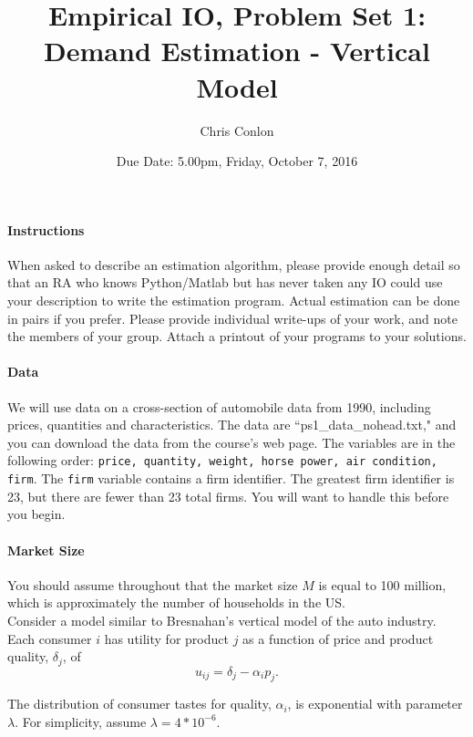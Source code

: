 \documentclass[12pt]{article}
\begin{document}
\title{Empirical IO, Problem Set 1: \\
Demand Estimation - Vertical Model}
\author{Chris Conlon}
\date{Due Date: 5.00pm, Friday, October 7, 2016}
\maketitle

\paragraph{Instructions} When asked to describe an estimation algorithm, please provide enough detail so
that an RA who knows Python/Matlab but has never taken any IO could use your description
to write the estimation program. Actual estimation can be done
in pairs if you prefer.  
Please provide individual write-ups of your work, and
note the members of your group. Attach a printout of your programs to your solutions.

\paragraph{Data} We will use data on a cross-section of automobile data from 1990, including prices, quantities and characteristics. The data are ``ps1\_data\_nohead.txt," and you can download the data from the course's web page. The variables are in the following order: \texttt{price, quantity, weight, horse power, air condition, firm}.
The \texttt{firm} variable contains a firm identifier. The greatest firm identifier is 23, but there are fewer than 23 total firms. You will want to handle this before you begin.

\paragraph{Market Size} You should assume throughout that the
market size $M$ is equal to 100 million, which is approximately the number
of households in the US. \\

\noindent
Consider a model similar to Bresnahan's vertical model of the auto industry.
Each consumer $i$ has utility for product $j$ as a function of price and
product quality, $\delta _{j}$, of
\[
u_{ij}=\delta _{j}-\alpha _{i}p_{j}.
\]

\noindent
The distribution of consumer tastes for quality, $\alpha _{i}$, is
exponential with parameter $\lambda $. For simplicity, assume $\lambda =4*10^{-6}$.
\end{document}
